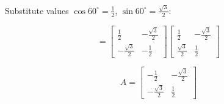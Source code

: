 \begin{enumerate}
\noindent Substitute values \(\cos 60^\circ = \frac{1}{2}\), \(\sin 60^\circ = \frac{\sqrt{3}}{2}\):

\[
=
\begin{bmatrix}
\frac{1}{2} & -\frac{\sqrt{3}}{2} \\
-\frac{\sqrt{3}}{2} & -\frac{1}{2}
\end{bmatrix}
\begin{bmatrix}
\frac{1}{2} & -\frac{\sqrt{3}}{2} \\
\frac{\sqrt{3}}{2} & \frac{1}{2}
\end{bmatrix}
\]

\[
\boxed{
A=
\begin{bmatrix}
-\frac{1}{2} & -\frac{\sqrt{3}}{2} \\
-\frac{\sqrt{3}}{2} & \frac{1}{2}
\end{bmatrix}}
\]

\end{enumerate}

  